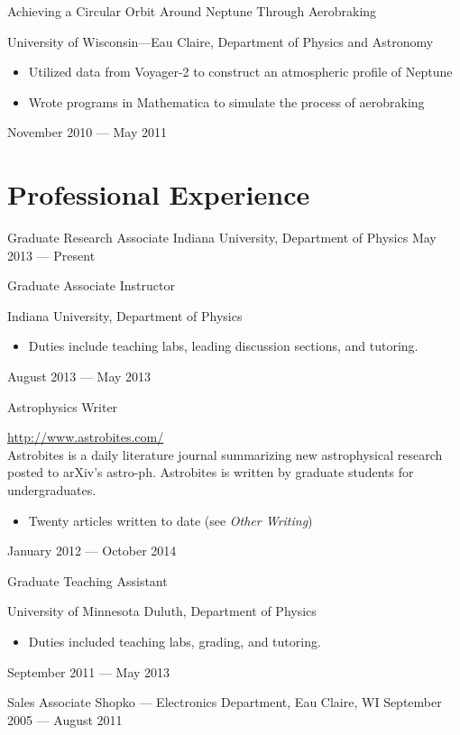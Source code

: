 \documentclass{cv}
\begin{document}
\begin{resume}
\objectLarge
{Achieving a Circular Orbit Around Neptune}
{Through Aerobraking}
{University of Wisconsin---Eau Claire, Department of Physics and Astronomy \noemph
\begin{itemize}
		\item Utilized data from Voyager-2 to construct an atmospheric profile of Neptune
		\item Wrote programs in Mathematica to simulate the process of aerobraking
	\end{itemize}
 }
{November 2010 --- May 2011}



\section{Professional Experience}

\object
{Graduate Research Associate}
{Indiana University, Department of Physics \noemph
 }
{May 2013 --- Present}


\object
{Graduate Associate Instructor}
{Indiana University, Department of Physics \noemph
	\begin{itemize}
		\item Duties include teaching labs, leading discussion sections, and tutoring.
	\end{itemize}
 }
{August 2013 --- May 2013}

\object
{Astrophysics Writer}
{\rm \href{http://astrobites.com/}{http://www.astrobites.com/} \noemph \\
Astrobites is a daily literature journal summarizing new astrophysical research posted to arXiv's astro-ph. Astrobites is written by graduate students for 	undergraduates.
	\begin{itemize}
		\item Twenty articles written to date (see \emph{Other Writing})
	\end{itemize}
 }
{January 2012 --- October 2014}


\object
{Graduate Teaching Assistant}
{University of Minnesota Duluth, Department of Physics \noemph
\begin{itemize}
		\item Duties included teaching labs, grading, and tutoring.
	\end{itemize}
 }
{September 2011 --- May 2013}


\object
{Sales Associate}
{Shopko --- Electronics Department, Eau Claire, WI}
{September 2005 --- August 2011}



\end{resume}
\end{document}
